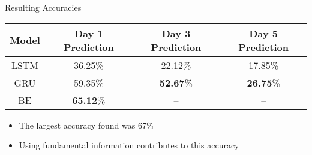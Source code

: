 \documentclass[xcolor=dvipsnames]{beamer}
\begin{document}
\begin{frame}{Resulting Accuracies}
	\begin{table}
	\centering
	\begin{tabular}{c c c c}
		\toprule
		Model & Day 1 Prediction & Day 3 Prediction & Day 5 Prediction\\
		\midrule
		LSTM & 36.25\% & 22.12\% & 17.85\%\\
		GRU & 59.35\% & \textbf{52.67}\% & \textbf{26.75}\%\\
		BE & \textbf{65.12}\% & -- & -- \\
		\bottomrule
	\end{tabular}
\end{table}
	\begin{itemize}
		\item The largest accuracy found was \alert{67\%}
		\item Using fundamental information contributes to this accuracy
	\end{itemize}
\end{frame}
\end{document}
